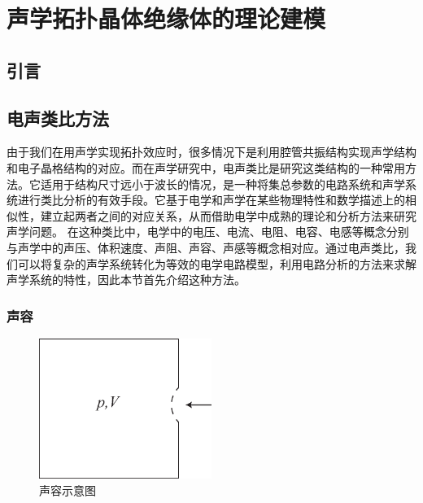 \chapter{声学拓扑晶体绝缘体的理论建模}
\section{引言}

\section{电声类比方法}

由于我们在用声学实现拓扑效应时，很多情况下是利用腔管共振结构实现声学结构和电子晶格结构的对应。而在声学研究中，电声类比是研究这类结构的一种常用方法。它适用于结构尺寸远小于波长的情况，是一种将集总参数的电路系统和声学系统进行类比分析的有效手段。它基于电学和声学在某些物理特性和数学描述上的相似性，建立起两者之间的对应关系，从而借助电学中成熟的理论和分析方法来研究声学问题。
在这种类比中，电学中的电压、电流、电阻、电容、电感等概念分别与声学中的声压、体积速度、声阻、声容、声感等概念相对应。通过电声类比，我们可以将复杂的声学系统转化为等效的电学电路模型，利用电路分析的方法来求解声学系统的特性，因此本节首先介绍这种方法。

\subsection{声容}

\begin{figure}[h!]
  \centering
  \includegraphics[width=0.5\textwidth]{images/fig2-1.eps} 
  \caption{声容示意图 }
  \label{fig_2_1}
\end{figure}

